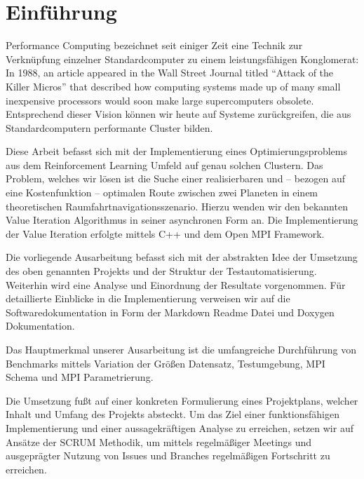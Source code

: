 \section{Einführung}
\label{sec:einfuehrung}
 Performance Computing bezeichnet seit einiger Zeit eine Technik zur Verknüpfung einzelner Standardcomputer zu einem leistungsfähigen Konglomerat: \glqq In 1988, an article appeared in the Wall Street Journal titled ``Attack of the Killer Micros'' that described how computing systems made up of many small inexpensive processors would soon make large supercomputers obsolete.\grqq~\citep[S.~3]{dowd1998high} Entsprechend dieser Vision können wir heute auf Systeme zurückgreifen, die aus Standardcomputern performante Cluster bilden.

Diese Arbeit befasst sich mit der Implementierung eines Optimierungsproblems aus dem Reinforcement Learning Umfeld auf genau solchen Clustern. Das Problem, welches wir lösen ist die Suche einer realisierbaren und -- bezogen auf eine Kostenfunktion -- optimalen Route zwischen zwei Planeten in einem theoretischen Raumfahrtnavigationsszenario. Hierzu wenden wir den bekannten Value Iteration Algorithmus in seiner asynchronen Form an. Die Implementierung der Value Iteration erfolgte mittels C++ und dem Open MPI Framework.

Die vorliegende Ausarbeitung befasst sich mit der abstrakten Idee der Umsetzung des oben genannten Projekts und der Struktur der Testautomatisierung. Weiterhin wird eine Analyse und Einordnung der Resultate vorgenommen. Für detaillierte Einblicke in die Implementierung verweisen wir auf die Softwaredokumentation in Form der Markdown Readme Datei und Doxygen Dokumentation.

Das Hauptmerkmal unserer Ausarbeitung ist die umfangreiche Durchführung von Benchmarks mittels Variation der Größen Datensatz, Testumgebung, MPI Schema und MPI Parametrierung.

Die Umsetzung fußt auf einer konkreten Formulierung eines Projektplans, welcher Inhalt und Umfang des Projekts absteckt. Um das Ziel einer funktionsfähigen Implementierung und einer aussagekräftigen Analyse zu erreichen, setzen wir auf Ansätze der SCRUM Methodik, um mittels regelmäßiger Meetings und ausgeprägter Nutzung von Issues und Branches regelmäßigen Fortschritt zu erreichen.

